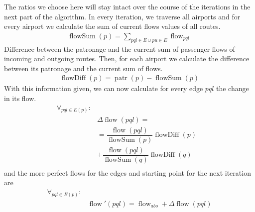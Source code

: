 \documentclass[twocolumn]{tum-article}
\DeclareMathOperator{\patronage}{patr}
\DeclareMathOperator{\flow}{flow}
\DeclareMathOperator{\flowSum}{flowSum}
\DeclareMathOperator{\flowDiff}{flowDiff}
\begin{document}
The ratios we choose here will stay intact over the course of the iterations in the next part of the algorithm.
In every iteration, we traverse all airports and for every airport we calculate the sum of current flows values of all routes. 
\begin{equation}
\begin{aligned}
\flowSum(p) = \displaystyle\sum_{pql \in E \cup pu \in E}\flow_{pql}
\end{aligned}
\end{equation}
Difference between the patronage and the current sum of passenger flows of incoming and outgoing routes. 
Then, for each airport we calculate the difference between its patronage and the current sum of flows.
\begin{equation}
\begin{aligned}
\flowDiff(p) = \patronage(p) - \flowSum(p) 
\end{aligned}
\end{equation}
With this information given, we can now calculate for every edge $pql$ the change in its flow. 
\begin{equation}
\begin{aligned}
\forall_{pql \in E(p)}: & \\
& \Delta \flow(pql) = & \\ 
& ={} \dfrac{\flow(pql)}{\flowSum(p)}\flowDiff(p) \\
& +{} \dfrac{\flow(pql)}{\flowSum(q)}\flowDiff(q) \\
\end{aligned}
\end{equation}
and the more perfect flows for the edges and starting point for the next iteration are
\begin{equation}
\begin{aligned}
\forall_{pql \in E(p)}: & \\
& \flow'(pql) = \flow_{abo} + \Delta \flow(pql)
\end{aligned}
\end{equation}
\end{document}
